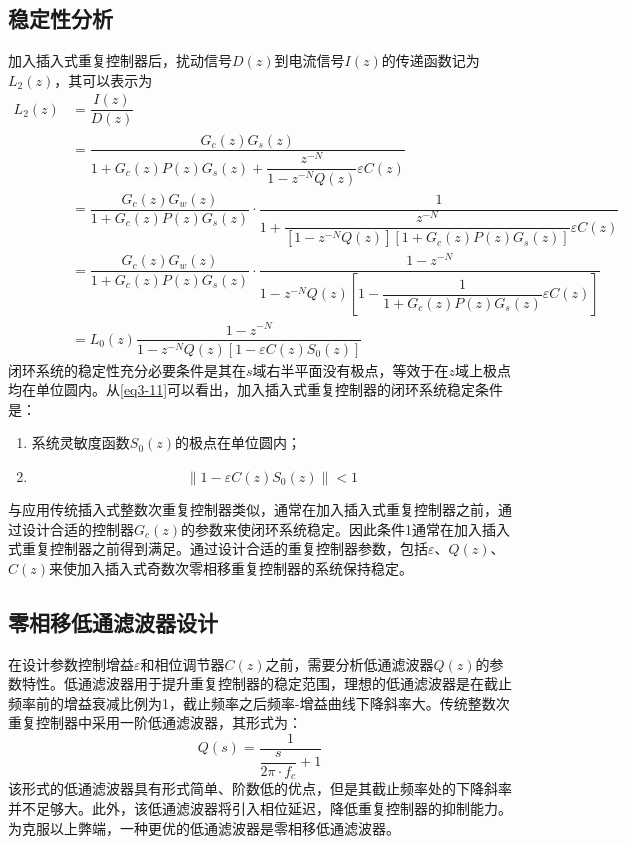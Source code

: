 \documentclass[
  lang=cn,
  degree=master,
  openany,oneside
]{nuaathesis}
\begin{document}
\subsection{稳定性分析}
加入插入式重复控制器后，扰动信号$D(z)$到电流信号$I(z)$的传递函数记为$L_2(z)$，其可以表示为
\begin{equation}
\label{eq3-11}
\begin{aligned}
L_2(z)
&=\dfrac{I(z)}{D(z)}\\
&=\dfrac{G_c(z)G_s(z)}{1+G_c(z)P(z)G_s(z)+\dfrac{z^{-N}}{1-z^{-N}Q(z)}\varepsilon C(z)}\\
&=\dfrac{G_c(z)G_w(z)}{1+G_c(z)P(z)G_s(z)}\cdot \dfrac{1}{1+\dfrac{z^{-N}}{[1-z^{-N}Q(z)][1+G_c(z)P(z)G_s(z)]}\varepsilon C(z)}\\
&=\dfrac{G_c(z)G_w(z)}{1+G_c(z)P(z)G_s(z)}\cdot \dfrac{1-z^{-N}}{1-z^{-N}Q(z)\left[1-\dfrac{1}{1+G_c(z)P(z)G_s(z)}\varepsilon C(z)\right]}\\
&=L_0(z)\dfrac{1-z^{-N}}{1-z^{-N}Q(z)[1-\varepsilon C(z)S_0(z)]}
\end{aligned}
\end{equation}
闭环系统的稳定性充分必要条件是其在$s$域右半平面没有极点，等效于在$z$域上极点均在单位圆内。从\autoref{eq3-11}可以看出，加入插入式重复控制器的闭环系统稳定条件是：
\begin{enumerate}
	\item 系统灵敏度函数$S_0(z)$的极点在单位圆内；
	\item 
	\begin{equation}
		\label{eq_stable_odd}
		\left\|1 - \varepsilon C(z)S_0(z) \right\| < 1
	\end{equation}
\end{enumerate}
与应用传统插入式整数次重复控制器类似，通常在加入插入式重复控制器之前，通过设计合适的控制器$G_c(z)$的参数来使闭环系统稳定。因此条件1通常在加入插入式重复控制器之前得到满足。通过设计合适的重复控制器参数，包括$\varepsilon$、$Q(z)$、$C(z)$来使加入插入式奇数次零相移重复控制器的系统保持稳定。
\subsection{零相移低通滤波器设计}
在设计参数控制增益$\varepsilon$和相位调节器$C(z)$之前，需要分析低通滤波器$Q(z)$的参数特性。低通滤波器用于提升重复控制器的稳定范围，理想的低通滤波器是在截止频率前的增益衰减比例为1，截止频率之后频率-增益曲线下降斜率大。传统整数次重复控制器中采用一阶低通滤波器，其形式为：
\begin{equation}
Q(s)=\dfrac{1}{\dfrac{s}{2\pi\cdot f_c}+1}
\end{equation}
该形式的低通滤波器具有形式简单、阶数低的优点，但是其截止频率处的下降斜率并不足够大。此外，该低通滤波器将引入相位延迟，降低重复控制器的抑制能力。为克服以上弊端，一种更优的低通滤波器是零相移低通滤波器。
\end{document}
